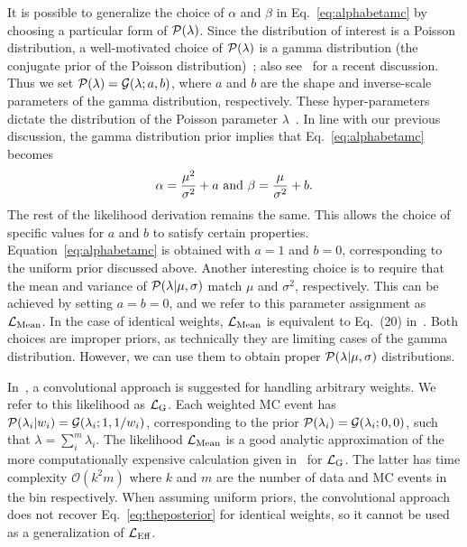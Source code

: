 It is possible to generalize the choice of $\alpha$ and $\beta$ in Eq.~\eqref{eq:alphabetamc} by choosing a particular form of $\mathcal{P}(\lambda)$. Since the distribution of interest is a Poisson distribution, a well-motivated choice of $\mathcal{P}(\lambda)$ is a gamma distribution (the conjugate prior of the Poisson distribution)~\cite{Fink97acompendium}; also see~\cite{Glusenkamp:2017rlp} for a recent discussion. Thus we set $\mathcal{P}(\lambda) = \mathcal{G}(\lambda; a, b)$, where $a$ and $b$ are the shape and inverse-scale parameters of the gamma distribution, respectively. These hyper-parameters dictate the distribution of the Poisson parameter $\lambda$~\cite{bernardo2009bayesian}. In line with our previous discussion, the gamma distribution prior implies that Eq.~\eqref{eq:alphabetamc} becomes
\begin{equation}\label{eq:alphabetagamma}
\alpha = \frac{\mu^2}{\sigma^2}+a~\textmd{and}~\beta=\frac{\mu}{\sigma^2}+b.
\end{equation}
The rest of the likelihood derivation remains the same. This allows the choice of specific values for $a$ and $b$ to satisfy certain properties. Equation~\eqref{eq:alphabetamc} is obtained with $a=1$ and $b=0$, corresponding to the uniform prior discussed above. Another interesting choice is to require that the mean and variance of $\mathcal{P}(\lambda|\mu, \sigma)$ match $\mu$ and $\sigma^2$, respectively. This can be achieved by setting $a=b=0$, and we refer to this parameter assignment as $\mathcal{L}_{\textmd{Mean}}$. In the case of identical weights, $\mathcal{L}_{\textmd{Mean}}$ is equivalent to Eq.~(20) in~\cite{Glusenkamp:2017rlp}. Both choices are improper priors, as technically they are limiting cases of the gamma distribution. However, we can use them to obtain proper $\mathcal{P}(\lambda|\mu, \sigma)$ distributions.

In~\cite{Glusenkamp:2017rlp}, a convolutional approach is suggested for handling arbitrary weights. We refer to this likelihood as $\mathcal{L}_\textmd{G}$. Each weighted MC event has $\mathcal{P}(\lambda_i|w_i)=\mathcal{G}(\lambda_i; 1, 1/w_i)$, corresponding to the prior $\mathcal{P}(\lambda_i) = \mathcal{G}(\lambda_i;0,0)$, such that $\lambda = \sum_i^m \lambda_i$. The likelihood $\mathcal{L}_{\textmd{Mean}}$ is a good analytic approximation of the more computationally expensive calculation given in~\cite{Glusenkamp:2017rlp} for $\mathcal{L}_\textmd{G}$. The latter has time complexity $\mathcal{O}(k^2 m)$ where $k$ and $m$ are the number of data and MC events in the bin respectively. When assuming uniform priors, the convolutional approach does not recover Eq.~\eqref{eq:theposterior} for identical weights, so it cannot be used as a generalization of $\mathcal{L}_\textmd{Eff}$.

